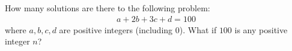 How many solutions are there to
the following problem:
\begin{align*}
a + 2b + 3c + d= 100
\end{align*}
where $a, b, c, d$ are positive integers (including $0$).
What if $100$ is any positive integer $n$?
